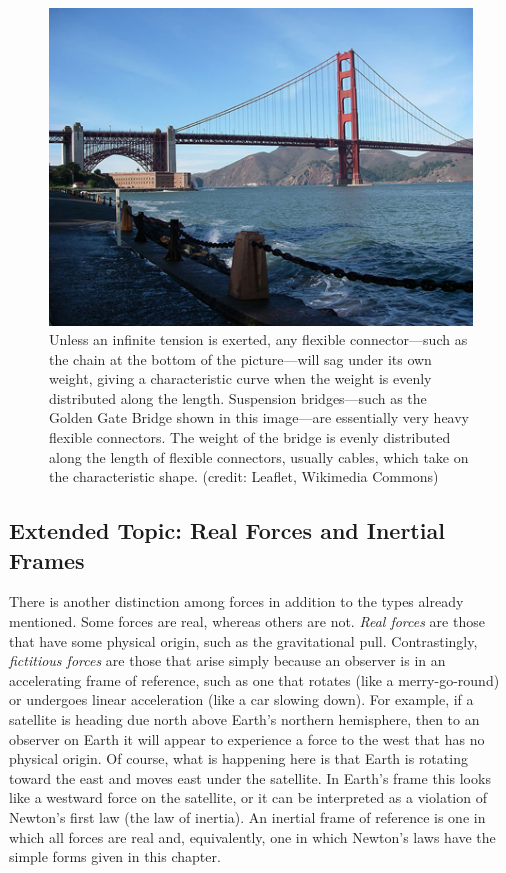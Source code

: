 \documentclass[
]{book}
\begin{document}
\begin{figure}
\hypertarget{import-auto-id1545449}{%
\centering
\includegraphics{images/Figure_04_05_09.jpg}
\caption{Unless an infinite tension is exerted, any flexible connector---such
as the chain at the bottom of the picture---will sag under its own
weight, giving a characteristic curve when the weight is evenly
distributed along the length. Suspension bridges---such as the Golden
Gate Bridge shown in this image---are essentially very heavy flexible
connectors. The weight of the bridge is evenly distributed along the
length of flexible connectors, usually cables, which take on the
characteristic shape. (credit: Leaflet, Wikimedia
Commons)}\label{import-auto-id1545449}
}
\end{figure}

\hypertarget{fs-id2687029}{}
\hypertarget{extended-topic-real-forces-and-inertial-frames}{%
\subsection{Extended Topic: Real Forces and Inertial Frames}\label{extended-topic-real-forces-and-inertial-frames}}

There is another distinction among forces in addition to the types
already mentioned. Some forces are real, whereas others are not. \emph{Real
forces}\textbf{} are those that have some
physical origin, such as the gravitational pull. Contrastingly,
\emph{fictitious forces} \textbf{}are those that
arise simply because an observer is in an accelerating frame of
reference, such as one that rotates (like a merry-go-round) or undergoes
linear acceleration (like a car slowing down). For example, if a
satellite is heading due north above Earth's northern hemisphere, then
to an observer on Earth it will appear to experience a force to the west
that has no physical origin. Of course, what is happening here is that
Earth is rotating toward the east and moves east under the satellite. In
Earth's frame this looks like a westward force on the satellite, or it
can be interpreted as a violation of Newton's first law (the law of
inertia). An \protect\hypertarget{import-auto-id2695882}{}{inertial frame of reference} is one in which all forces are real and, equivalently,
one in which Newton's laws have the simple forms given in this chapter.
\end{document}

